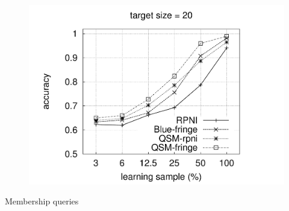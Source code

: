 \begin{figure}[H]
{  \includegraphics[trim=25mm 21mm 35mm 20mm, clip, page=19]{src/5-evaluation/images/accuracy}
}
\end{figure}

\vspace{-0cm}
{\noindent\small\sc Membership queries}
\vspace{-0cm}


